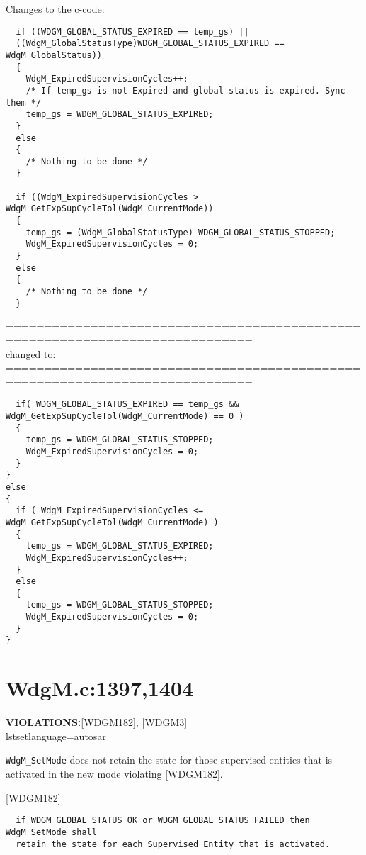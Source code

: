 \documentclass[11pt,a4paper]{article}
\begin{document}
\lstset{language=c}

Changes to the c-code:
\begin{lstlisting}
  if ((WDGM_GLOBAL_STATUS_EXPIRED == temp_gs) ||
  ((WdgM_GlobalStatusType)WDGM_GLOBAL_STATUS_EXPIRED == WdgM_GlobalStatus))
  {
    WdgM_ExpiredSupervisionCycles++;
    /* If temp_gs is not Expired and global status is expired. Sync them */
    temp_gs = WDGM_GLOBAL_STATUS_EXPIRED;
  }
  else
  {
    /* Nothing to be done */
  }

  if ((WdgM_ExpiredSupervisionCycles > WdgM_GetExpSupCycleTol(WdgM_CurrentMode))
  {
    temp_gs = (WdgM_GlobalStatusType) WDGM_GLOBAL_STATUS_STOPPED;
    WdgM_ExpiredSupervisionCycles = 0;
  }
  else
  {
    /* Nothing to be done */
  }
\end{lstlisting}
==============================================================================\\
changed to:\\
==============================================================================
\begin{lstlisting}
  if( WDGM_GLOBAL_STATUS_EXPIRED == temp_gs && WdgM_GetExpSupCycleTol(WdgM_CurrentMode) == 0 )
  {
    temp_gs = WDGM_GLOBAL_STATUS_STOPPED;
    WdgM_ExpiredSupervisionCycles = 0;
  }
}
else
{
  if ( WdgM_ExpiredSupervisionCycles <= WdgM_GetExpSupCycleTol(WdgM_CurrentMode) )
  {
    temp_gs = WDGM_GLOBAL_STATUS_EXPIRED;
    WdgM_ExpiredSupervisionCycles++;
  }
  else
  {
    temp_gs = WDGM_GLOBAL_STATUS_STOPPED;
    WdgM_ExpiredSupervisionCycles = 0;
  }
}
\end{lstlisting}
\newpage

\section{WdgM.c:1397,1404}
\textbf{VIOLATIONS:}[WDGM182], [WDGM3]\\

lstset{language=autosar}

\lstinline!WdgM_SetMode! does not retain the state for those supervised entities
that is activated in the new mode violating [WDGM182].

[WDGM182]
\begin{lstlisting}
  if WDGM_GLOBAL_STATUS_OK or WDGM_GLOBAL_STATUS_FAILED then WdgM_SetMode shall
  retain the state for each Supervised Entity that is activated.
\end{lstlisting}~\\
\end{document}
